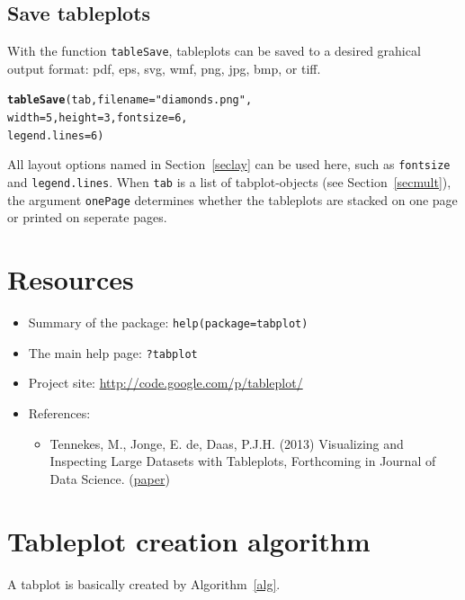 \documentclass[11pt, fleqn, a4paper]{article}\usepackage{graphicx, color}
\makeatletter
\newcommand{\hlfunctioncall}[1]{\textcolor[rgb]{0.501960784313725,0,0.329411764705882}{\textbf{#1}}}%
\newcommand{\hlstring}[1]{\textcolor[rgb]{0.6,0.6,1}{#1}}%
\newenvironment{kframe}{%
 \def\at@end@of@kframe{}%
 \ifinner\ifhmode%
  \def\at@end@of@kframe{\end{minipage}}%
  \begin{minipage}{\columnwidth}%
 \fi\fi%
 \def\FrameCommand##1{\hskip\@totalleftmargin \hskip-\fboxsep
 \colorbox{shadecolor}{##1}\hskip-\fboxsep
     \hskip-\linewidth \hskip-\@totalleftmargin \hskip\columnwidth}%
 \MakeFramed {\advance\hsize-\width
   \@totalleftmargin\z@ \linewidth\hsize
   \@setminipage}}%
 {\par\unskip\endMakeFramed%
 \at@end@of@kframe}
\newenvironment{knitrout}{}{} %
\makeatother
\begin{document}
\subsection{Save tableplots}\label{secsave}

With the function {\tt tableSave}, tableplots can be saved to a desired grahical output format: pdf, eps, svg, wmf, png, jpg, bmp, or tiff.

\begin{knitrout}
\color{fgcolor}\begin{kframe}
\begin{alltt}
\hlfunctioncall{tableSave}(tab, filename = \hlstring{"diamonds.png"}, 
    width = 5, height = 3, fontsize = 6, 
    legend.lines = 6)
\end{alltt}
\end{kframe}
\end{knitrout}


All layout options named in Section~\ref{seclay} can be used here, such as {\tt fontsize} and {\tt legend.lines}. When {\tt tab} is a list of tabplot-objects (see Section~\ref{secmult}), the argument {\tt onePage} determines whether the tableplots are stacked on one page or printed on seperate pages.

\newpage

\section*{Resources}

\begin{itemize}
\item Summary of the package: {\tt help(package=tabplot)}
\item The main help page: {\tt ?tabplot}
\item Project site: \url{http://code.google.com/p/tableplot/}
\item References:
\begin{itemize}
\item Tennekes, M., Jonge, E. de, Daas, P.J.H. (2013) Visualizing and Inspecting Large Datasets with Tableplots, Forthcoming in Journal of Data Science. (\href{http://www.jds-online.com/file_download/379/JDS-1108.pdf}{paper})
\end{itemize}
\end{itemize}


\appendix
\newpage
\section{Tableplot creation algorithm}\label{secalg}
A tabplot is basically created by Algorithm~\ref{alg}.
\end{document}
